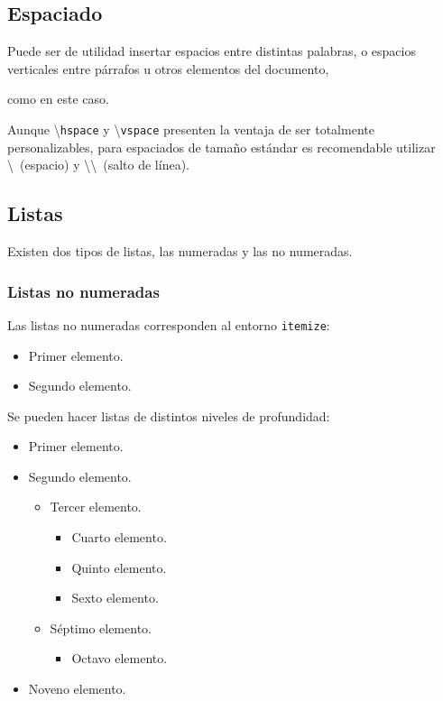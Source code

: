 \documentclass[a4paper, 11pt, spanish, twoside]{article}
\begin{document}
\subsection{Espaciado}

Puede ser de utilidad insertar \hspace{0.5cm} espacios \hspace{1cm} entre distintas \hspace{2cm} palabras, o espacios verticales entre párrafos u otros elementos del documento,

\vspace{6cm}

como en este caso.

Aunque \textbackslash\texttt{hspace} y \textbackslash\texttt{vspace} presenten la ventaja de ser totalmente personalizables, para espaciados de tamaño estándar es recomendable utilizar \textbackslash \ (espacio) y \textbackslash\textbackslash \ (salto de línea).


\subsection{Listas}

Existen dos tipos de listas, las numeradas y las no numeradas.


\subsubsection{Listas no numeradas}

Las listas no numeradas corresponden al entorno \texttt{itemize}:

\begin{itemize}
    \item Primer elemento.
    \item Segundo elemento.
\end{itemize}

Se pueden hacer listas de distintos niveles de profundidad:

\begin{itemize}
    \item Primer elemento.
    \item Segundo elemento.
    \begin{itemize}
        \item Tercer elemento.
        \begin{itemize}
            \item Cuarto elemento.
            \item Quinto elemento.
        \item Sexto elemento.
        \end{itemize}
        \item Séptimo elemento.
        \begin{itemize}
            \item Octavo elemento.
        \end{itemize}
    \end{itemize}
    \item Noveno elemento.
\end{itemize}
\end{document}
